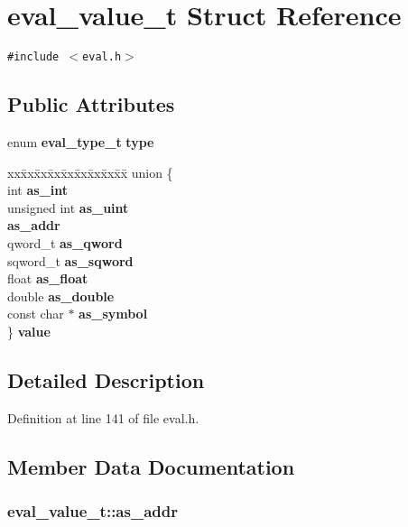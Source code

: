 \section{eval\_\-value\_\-t Struct Reference}
\label{structeval__value__t}
{\tt \#include $<$eval.h$>$}

\subsection*{Public Attributes}
\begin{CompactItemize}
\item 
enum {\bf eval\_\-type\_\-t} {\bf type}
\item 
\begin{tabbing}
xx\=xx\=xx\=xx\=xx\=xx\=xx\=xx\=xx\=\kill
union \{\\
\>int {\bf as\_int}\\
\>unsigned int {\bf as\_uint}\\
 {\bf as\_addr}\\
\>qword\_t {\bf as\_qword}\\
\>sqword\_t {\bf as\_sqword}\\
\>float {\bf as\_float}\\
\>double {\bf as\_double}\\
\>const char $\ast$ {\bf as\_symbol}\\
\} {\bf value}\\

\end{tabbing}\end{CompactItemize}


\subsection{Detailed Description}


Definition at line 141 of file eval.h.

\subsection{Member Data Documentation}
\subsubsection[{as\_\-addr}]{ {\bf eval\_\-value\_\-t::as\_\-addr}}\label{structeval__value__t_28d80c114eef0dd51f81c35a4ae9204d}




